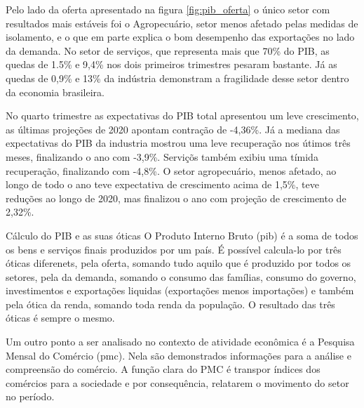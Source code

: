 \par Pelo lado da oferta apresentado na figura \ref{fig:pib_oferta} o único setor com resultados mais estáveis foi o Agropecuário, setor menos afetado pelas medidas de isolamento, e o que em parte explica o bom desempenho das exportações no lado da demanda. No setor de serviços, que representa mais que 70\% do PIB, as quedas de 1.5\% e 9,4\% nos dois primeiros trimestres pesaram bastante. Já as quedas de 0,9\% e 13\% da indústria demonstram a fragilidade desse setor dentro da economia brasileira.
\par No quarto trimestre as expectativas do PIB total apresentou um leve crescimento, as últimas projeções de 2020 apontam contração de -4,36\%. Já a mediana das expectativas do PIB da industria mostrou uma leve recuperação nos útimos três meses, finalizando o ano com -3,9\%. Serviçõs também exibiu uma tímida recuperação, finalizando com -4,8\%. O setor agropecuário, menos afetado, ao longo de todo o ano teve expectativa de crescimento acima de 1,5\%, teve reduções ao longo de 2020, mas finalizou o ano com projeção de crescimento de 2,32\%.

\begin{smbox}[label={labelbox},nameref={Cálculo do PIB e as suas óticas}]{Cálculo do PIB e as suas óticas}
	O Produto Interno Bruto (\acrshort{pib}) é a soma de todos os bens e serviços finais produzidos por um país. É possível calcula-lo por três óticas diferenets, pela oferta, somando tudo aquilo que é produzido por todos os setores, pela da demanda, somando o consumo das famílias, consumo do governo, investimentos e exportações liquidas (exportações menos importações) e também pela ótica da renda, somando toda renda da população. O resultado das três óticas é sempre o mesmo.
\end{smbox}


\par Um outro ponto a ser analisado no contexto de atividade econômica é a Pesquisa Mensal do Comércio (\acrshort{pmc}). Nela são demonstrados informações para a análise e compreensão do comércio. A função clara do PMC é transpor índices dos comércios para a sociedade e por consequência, relatarem o movimento do setor no período.


